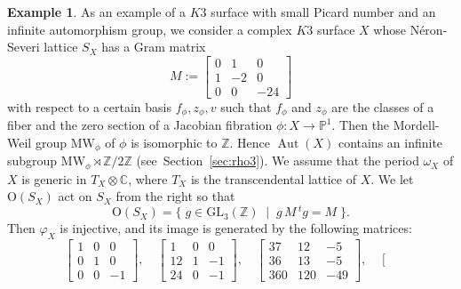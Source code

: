 \documentclass{amsart}
\theoremstyle{plain}
\theoremstyle{definition}
\newtheorem{example}[theorem]{Example}
\theoremstyle{remark}
\numberwithin{equation}{section}
\numberwithin{table}{section}
\numberwithin{figure}{section}
\newcommand{\C}{\mathord{\mathbb C}}
\renewcommand{\P}{\mathord{\mathbb  P}}
\newcommand{\Z}{\mathord{\mathbb Z}}
\newcommand{\set}[2]{\{\; {#1} \; \mid \; {#2} \;  \}}
\newcommand{\tensor}{\otimes}
\newcommand{\semidirectproduct}{\rtimes}
\newcommand{\GL}{\mathord{\mathrm {GL}}}
\newcommand{\OG}{\mathord{\mathrm {O}}}
\newcommand{\Aut}{\operatorname{\mathrm {Aut}}\nolimits}
\newcommand{\MW}{\mathord{\mathrm{MW}}}
\begin{document}
\begin{example}\label{example:24}
%
%
As an example of a $K3$ surface with small Picard number and an infinite automorphism group,
we consider a complex $K3$ surface $X$  whose N\'eron-Severi lattice 
$S_X$ has
a Gram matrix 
$$
M:=\left[\begin{array}{ccc}
0 & 1 & 0 \\
1 & -2 & 0\\
0 & 0 & -24
\end{array}\right]
$$
with respect to a  certain basis $f_{\phi}, z_{\phi},  v$  such that 
$f_{\phi}$ and $z_{\phi}$ are the classes of a fiber and the zero section of a Jacobian fibration  $\phi: X\to \P^1$.
Then the  Mordell-Weil group $\MW_{\phi}$ of $\phi$ is isomorphic to $\Z$.
Hence $\Aut(X)$ contains an infinite subgroup $\MW_{\phi}\semidirectproduct \Z/2\Z$
(see~Section~\ref{sec:rho3}).
We assume  that the period $\omega_X$ of $X$ is generic in $T_X\tensor \C$,
where $T_X$ is the transcendental lattice of $X$.
%
We let $\OG(S_X)$ act on $S_X$ from the right so that
$$
\OG(S_X)=\set{g\in \GL_3(\Z)}{g \,M\,{}^t g=M}.
$$
Then %
$\varphi_X$
is injective, and its image is generated by the following  matrices:
$$
\left[
\begin{array}{ccc}
1 & 0 & 0 \\
0 & 1 & 0\\
0 & 0 & -1
\end{array}\right],
\quad
\left[
\begin{array}{ccc}
1 & 0 & 0 \\
12 & 1 & -1\\
24 & 0 & -1
\end{array}\right],
\quad
\left[\begin{array}{ccc}
37 & 12 & -5 \\
36 & 13 & -5\\
360 & 120 & -49
\end{array}\right],
\quad
\left[\begin{array}{ccc}

\end{array}$$
\end{example}
\end{document}
